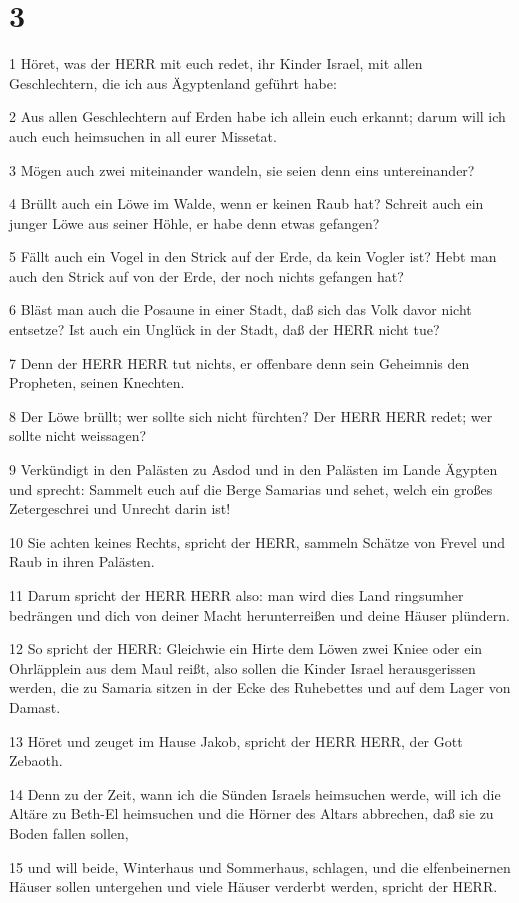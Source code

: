 \chapter{3}

\par 1 Höret, was der HERR mit euch redet, ihr Kinder Israel, mit allen Geschlechtern, die ich aus Ägyptenland geführt habe:
\par 2 Aus allen Geschlechtern auf Erden habe ich allein euch erkannt; darum will ich auch euch heimsuchen in all eurer Missetat.
\par 3 Mögen auch zwei miteinander wandeln, sie seien denn eins untereinander?
\par 4 Brüllt auch ein Löwe im Walde, wenn er keinen Raub hat? Schreit auch ein junger Löwe aus seiner Höhle, er habe denn etwas gefangen?
\par 5 Fällt auch ein Vogel in den Strick auf der Erde, da kein Vogler ist? Hebt man auch den Strick auf von der Erde, der noch nichts gefangen hat?
\par 6 Bläst man auch die Posaune in einer Stadt, daß sich das Volk davor nicht entsetze? Ist auch ein Unglück in der Stadt, daß der HERR nicht tue?
\par 7 Denn der HERR HERR tut nichts, er offenbare denn sein Geheimnis den Propheten, seinen Knechten.
\par 8 Der Löwe brüllt; wer sollte sich nicht fürchten? Der HERR HERR redet; wer sollte nicht weissagen?
\par 9 Verkündigt in den Palästen zu Asdod und in den Palästen im Lande Ägypten und sprecht: Sammelt euch auf die Berge Samarias und sehet, welch ein großes Zetergeschrei und Unrecht darin ist!
\par 10 Sie achten keines Rechts, spricht der HERR, sammeln Schätze von Frevel und Raub in ihren Palästen.
\par 11 Darum spricht der HERR HERR also: man wird dies Land ringsumher bedrängen und dich von deiner Macht herunterreißen und deine Häuser plündern.
\par 12 So spricht der HERR: Gleichwie ein Hirte dem Löwen zwei Kniee oder ein Ohrläpplein aus dem Maul reißt, also sollen die Kinder Israel herausgerissen werden, die zu Samaria sitzen in der Ecke des Ruhebettes und auf dem Lager von Damast.
\par 13 Höret und zeuget im Hause Jakob, spricht der HERR HERR, der Gott Zebaoth.
\par 14 Denn zu der Zeit, wann ich die Sünden Israels heimsuchen werde, will ich die Altäre zu Beth-El heimsuchen und die Hörner des Altars abbrechen, daß sie zu Boden fallen sollen,
\par 15 und will beide, Winterhaus und Sommerhaus, schlagen, und die elfenbeinernen Häuser sollen untergehen und viele Häuser verderbt werden, spricht der HERR.

